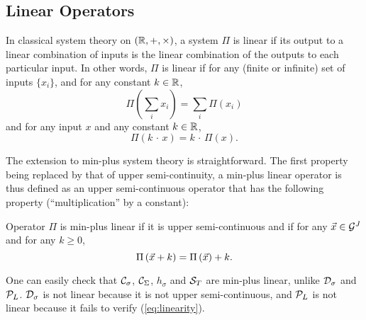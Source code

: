 \subsection{Linear Operators}

In classical system theory on $(\mathbb{R}, +, \times)$, a system $\Pi$ is linear if its output to a linear combination of inputs
is the linear combination of the outputs to each particular input. In other words, $\Pi$ is linear if
for any (finite or infinite) set of inputs $\{ x_i \}$, and for any constant $k \in \mathbb{R}$,
$$\Pi \left( \sum_{i} x_i \right) =  \sum_{i} \Pi (x_i) $$
and for any input $x$ and any constant $k \in \mathbb{R}$,
$$ \Pi \left( k \, \cdot \, x \right)  =  k \, \cdot \, \Pi (x).  $$

The extension to min-plus system theory is straightforward. The first property being replaced by that of upper semi-continuity,
a min-plus linear operator is thus defined as an upper semi-continuous operator that has
the following property (``multiplication'' by a constant):

%




\begin{definition}
Operator $\Pi$ is min-plus linear if it is upper semi-continuous and if for any $\vec{x} \in \mathcal G^J$ and for any $k \geq 0$,
\begin{equation}
\mylabel{eq:linearity}
\Pi \left( \vec{x} + k \right) =  \Pi \left( \vec{x} \right) + k.
\end{equation}
\end{definition}

One can easily check that $\mathcal C_{\sigma}$, $\mathcal C_{\Sigma}$,
$h_\sigma$ and $\mathcal S_T$ are min-plus linear, unlike
$\mathcal D_{\sigma}$ and $\mathcal P_L$. $\mathcal D_{\sigma}$ is not linear
because it is not upper semi-continuous,
and $\mathcal P_L$ is not linear because %
it fails to verify (\ref{eq:linearity}).

